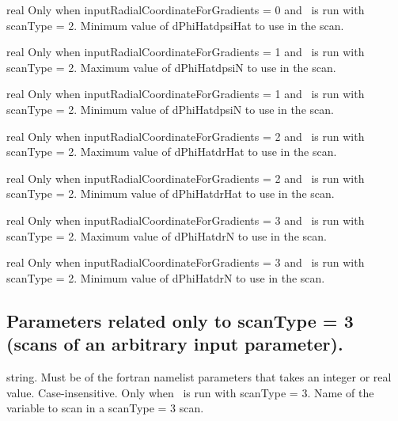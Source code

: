 \myhrule

{real}
{Only when {\ttfamily inputRadialCoordinateForGradients} = 0 and \sfincsScan~is run with {\ttfamily scanType} = 2.}
{Minimum value of {\ttfamily dPhiHatdpsiHat} to use in the scan.}

\myhrule

{real}
{Only when {\ttfamily inputRadialCoordinateForGradients} = 1 and \sfincsScan~is run with {\ttfamily scanType} = 2.}
{Maximum value of {\ttfamily dPhiHatdpsiN} to use in the scan.}

\myhrule

{real}
{Only when {\ttfamily inputRadialCoordinateForGradients} = 1 and \sfincsScan~is run with {\ttfamily scanType} = 2.}
{Minimum value of {\ttfamily dPhiHatdpsiN} to use in the scan.}

\myhrule

{real}
{Only when {\ttfamily inputRadialCoordinateForGradients} = 2 and \sfincsScan~is run with {\ttfamily scanType} = 2.}
{Maximum value of {\ttfamily dPhiHatdrHat} to use in the scan.}

\myhrule

{real}
{Only when {\ttfamily inputRadialCoordinateForGradients} = 2 and \sfincsScan~is run with {\ttfamily scanType} = 2.}
{Minimum value of {\ttfamily dPhiHatdrHat} to use in the scan.}

\myhrule

{real}
{Only when {\ttfamily inputRadialCoordinateForGradients} = 3 and \sfincsScan~is run with {\ttfamily scanType} = 2.}
{Maximum value of {\ttfamily dPhiHatdrN} to use in the scan.}

\myhrule

{real}
{Only when {\ttfamily inputRadialCoordinateForGradients} = 3 and \sfincsScan~is run with {\ttfamily scanType} = 2.}
{Minimum value of {\ttfamily dPhiHatdrN} to use in the scan.}

\subsection{Parameters related only to {\ttfamily scanType} = 3 (scans of an arbitrary input parameter).}

{string. Must be of the fortran namelist parameters that takes an integer or real value. Case-insensitive.}
{Only when \sfincsScan~is run with {\ttfamily scanType} = 3.}
{Name of the variable to scan in a {\ttfamily scanType} = 3 scan.}

